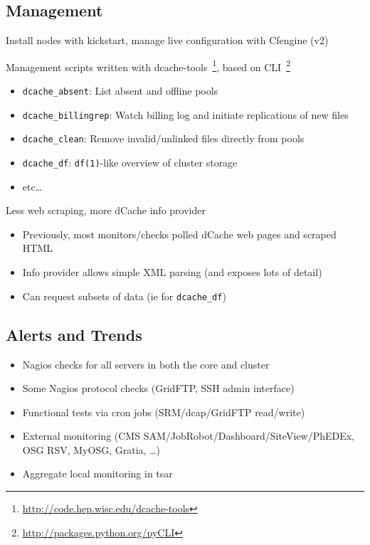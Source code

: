 \documentclass{beamer}
\begin{document}
\subsection{Management} %
\begin{frame}
	\item Install nodes with kickstart, manage live configuration with Cfengine (v2)
	\item Management scripts written with dcache-tools~\footnote{\url{http://code.hep.wisc.edu/dcache-tools}}, based on CLI~\footnote{\url{http://packages.python.org/pyCLI}}
	\begin{itemize}
		\item {\tt dcache_absent}: List absent and offline pools
		\item {\tt dcache_billingrep}: Watch billing log and initiate replications of new files
		\item {\tt dcache_clean}: Remove invalid/unlinked files directly from pools
		\item {\tt dcache_df}: {\tt df(1)}-like overview of cluster storage
		\item etc\ldots{}
	\end{itemize}
	\item Less web scraping, more dCache info provider
	\begin{itemize}
		\item Previously, most monitors/checks polled dCache web pages and scraped HTML
		\item Info provider allows simple XML parsing (and exposes lots of detail)
		\item Can request subsets of data (ie for {\tt dcache_df})
	\end{itemize}
\end{frame}

\subsection{Alerts and Trends} %
\begin{frame}
\begin{itemize}
	\item Nagios checks for all servers in both the core and cluster
	\item Some Nagios protocol checks (GridFTP, SSH admin interface)
	\item Functional tests via cron jobs (SRM/dcap/GridFTP read/write)
	\item External monitoring (CMS SAM/JobRobot/Dashboard/SiteView/PhEDEx, OSG RSV, MyOSG, Gratia, \ldots{})
	\item Aggregate local monitoring in tsar
\end{itemize}
\end{frame}
\end{document}

